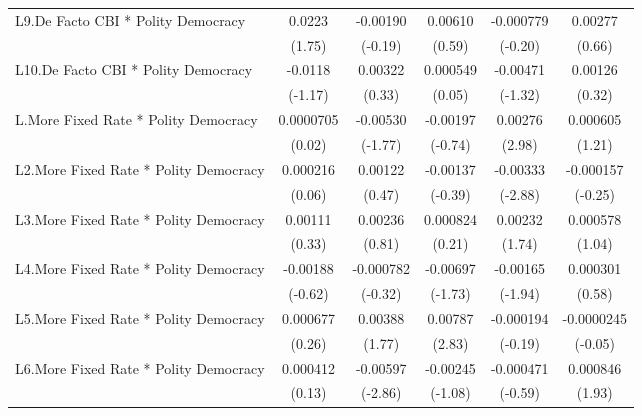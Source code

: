 {\begin{longtable}{l*{5}{c}}
\addlinespace
L9.De Facto CBI * Polity Democracy&   0.0223         & -0.00190         &  0.00610         &-0.000779         &  0.00277         \\
                &   (1.75)         &  (-0.19)         &   (0.59)         &  (-0.20)         &   (0.66)         \\
\addlinespace
L10.De Facto CBI * Polity Democracy&  -0.0118         &  0.00322         & 0.000549         & -0.00471         &  0.00126         \\
                &  (-1.17)         &   (0.33)         &   (0.05)         &  (-1.32)         &   (0.32)         \\
\addlinespace
L.More Fixed Rate * Polity Democracy&0.0000705         & -0.00530         & -0.00197         &  0.00276\sym{**} & 0.000605         \\
                &   (0.02)         &  (-1.77)         &  (-0.74)         &   (2.98)         &   (1.21)         \\
\addlinespace
L2.More Fixed Rate * Polity Democracy& 0.000216         &  0.00122         & -0.00137         & -0.00333\sym{**} &-0.000157         \\
                &   (0.06)         &   (0.47)         &  (-0.39)         &  (-2.88)         &  (-0.25)         \\
\addlinespace
L3.More Fixed Rate * Polity Democracy&  0.00111         &  0.00236         & 0.000824         &  0.00232         & 0.000578         \\
                &   (0.33)         &   (0.81)         &   (0.21)         &   (1.74)         &   (1.04)         \\
\addlinespace
L4.More Fixed Rate * Polity Democracy& -0.00188         &-0.000782         & -0.00697         & -0.00165         & 0.000301         \\
                &  (-0.62)         &  (-0.32)         &  (-1.73)         &  (-1.94)         &   (0.58)         \\
\addlinespace
L5.More Fixed Rate * Polity Democracy& 0.000677         &  0.00388         &  0.00787\sym{**} &-0.000194         &-0.0000245         \\
                &   (0.26)         &   (1.77)         &   (2.83)         &  (-0.19)         &  (-0.05)         \\
\addlinespace
L6.More Fixed Rate * Polity Democracy& 0.000412         & -0.00597\sym{**} & -0.00245         &-0.000471         & 0.000846         \\
                &   (0.13)         &  (-2.86)         &  (-1.08)         &  (-0.59)         &   (1.93)         \\

\end{longtable}}

